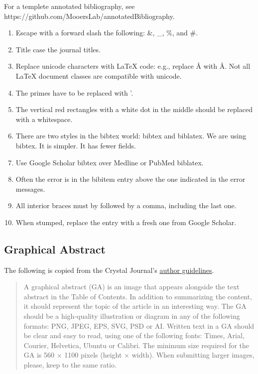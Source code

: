 \documentclass[10pt,letterpaper]{article}
\newcommand{\be}{\begin{enumerate}}
\newcommand{\ee}{\end{enumerate}}
\begin{document}
For a templete annotated bibliography, see https://github.com/MooersLab/annotatedBibliography.

\be
\item Escape with a forward slash the following: \&, \_, \%, and \#. 
\item Title case the journal titles.
\item Replace unicode characters with LaTeX code: e.g., replace Å with \AA. Not all LaTeX document classes are compatible with unicode.
\item The primes have to be replaced with '.
\item The vertical red rectangles with a white dot in the middle should be replaced with a whitespace.
\item There are two styles in the bibtex world: bibtex and biblatex. We are using bibtex. It is simpler. It has fewer fields.
\item Use Google Scholar bibtex over Medline or PubMed biblatex. 
\item Often the error is in the bibitem entry above the one indicated in the error messages.
\item All interior braces must by followed by a comma, including the last one.
\item When stumped, replace the entry with a fresh one from Google Scholar.
\ee



\subsection{Graphical Abstract}
\label{subsec:guides:graphicalAbstract}


The following is copied from the Crystal Journal's \href{https://www.mdpi.com/journal/crystals/instructions#preparation}{author guidelines}.

\begin{quote}
A graphical abstract (GA) is an image that appears alongside the text abstract in the Table of Contents. 
In addition to summarizing the content, it should represent the topic of the article in an interesting way.
The GA should be a high-quality illustration or diagram in any of the following formats: PNG, JPEG, EPS, SVG, PSD or AI. 
Written text in a GA should be clear and easy to read, using one of the following fonts: Times, Arial, Courier, Helvetica, Ubuntu or Calibri.
The minimum size required for the GA is 560 $\times$ 1100 pixels (height $\times$ width). 
When submitting larger images, please, keep to the same ratio.
\end{quote}
\end{document}
